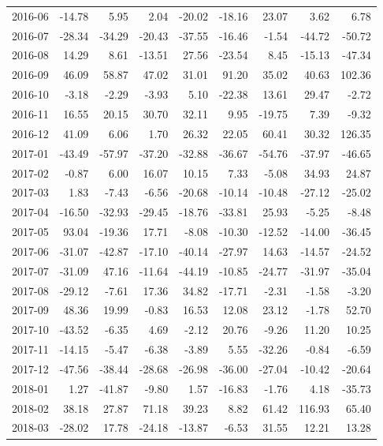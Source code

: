 \begin{table}[ht]
\begin{tabular}{lrrrrrrrr}
  2016-06 & -14.78 & 5.95 & 2.04 & -20.02 & -18.16 & 23.07 & 3.62 & 6.78 \\ 
  2016-07 & -28.34 & -34.29 & -20.43 & -37.55 & -16.46 & -1.54 & -44.72 & -50.72 \\ 
  2016-08 & 14.29 & 8.61 & -13.51 & 27.56 & -23.54 & 8.45 & -15.13 & -47.34 \\ 
  2016-09 & 46.09 & 58.87 & 47.02 & 31.01 & 91.20 & 35.02 & 40.63 & 102.36 \\ 
  2016-10 & -3.18 & -2.29 & -3.93 & 5.10 & -22.38 & 13.61 & 29.47 & -2.72 \\ 
  2016-11 & 16.55 & 20.15 & 30.70 & 32.11 & 9.95 & -19.75 & 7.39 & -9.32 \\ 
  2016-12 & 41.09 & 6.06 & 1.70 & 26.32 & 22.05 & 60.41 & 30.32 & 126.35 \\ 
  2017-01 & -43.49 & -57.97 & -37.20 & -32.88 & -36.67 & -54.76 & -37.97 & -46.65 \\ 
  2017-02 & -0.87 & 6.00 & 16.07 & 10.15 & 7.33 & -5.08 & 34.93 & 24.87 \\ 
  2017-03 & 1.83 & -7.43 & -6.56 & -20.68 & -10.14 & -10.48 & -27.12 & -25.02 \\ 
  2017-04 & -16.50 & -32.93 & -29.45 & -18.76 & -33.81 & 25.93 & -5.25 & -8.48 \\ 
  2017-05 & 93.04 & -19.36 & 17.71 & -8.08 & -10.30 & -12.52 & -14.00 & -36.45 \\ 
  2017-06 & -31.07 & -42.87 & -17.10 & -40.14 & -27.97 & 14.63 & -14.57 & -24.52 \\ 
  2017-07 & -31.09 & 47.16 & -11.64 & -44.19 & -10.85 & -24.77 & -31.97 & -35.04 \\ 
  2017-08 & -29.12 & -7.61 & 17.36 & 34.82 & -17.71 & -2.31 & -1.58 & -3.20 \\ 
  2017-09 & 48.36 & 19.99 & -0.83 & 16.53 & 12.08 & 23.12 & -1.78 & 52.70 \\ 
  2017-10 & -43.52 & -6.35 & 4.69 & -2.12 & 20.76 & -9.26 & 11.20 & 10.25 \\ 
  2017-11 & -14.15 & -5.47 & -6.38 & -3.89 & 5.55 & -32.26 & -0.84 & -6.59 \\ 
  2017-12 & -47.56 & -38.44 & -28.68 & -26.98 & -36.00 & -27.04 & -10.42 & -20.64 \\ 
  2018-01 & 1.27 & -41.87 & -9.80 & 1.57 & -16.83 & -1.76 & 4.18 & -35.73 \\ 
  2018-02 & 38.18 & 27.87 & 71.18 & 39.23 & 8.82 & 61.42 & 116.93 & 65.40 \\ 
  2018-03 & -28.02 & 17.78 & -24.18 & -13.87 & -6.53 & 31.55 & 12.21 & 13.28 \\ 

\end{tabular}
\end{table}
